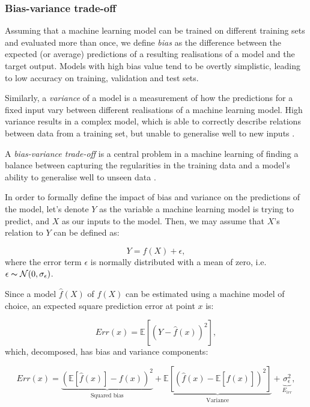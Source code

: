 \subsubsection{Bias-variance trade-off}

Assuming that a machine learning model can be trained on different training sets and evaluated more than once, we define \emph{bias} as the difference between the expected (or average) predictions of a resulting realisations of a model and the target output. Models with high bias value tend to be overtly simplistic, leading to low accuracy on training, validation and test sets.

Similarly, a \emph{variance} of a model is a measurement of how the predictions for a fixed input vary between different realisations of a machine learning model. High variance results in a complex model, which is able to correctly describe relations between data from a training set, but unable to generalise well to new inputs \cite{fortmann-roe:biasvariance}.

A \emph{bias-variance trade-off} is a central problem in a machine learning of finding a balance between capturing the regularities in the training data and a model's ability to generalise well to unseen data \cite{wiki:biasvariance}.

In order to formally define the impact of bias and variance on the predictions of the model, let's denote $Y$ as the variable a machine learning model is trying to predict, and $X$ as our inputs to the model. Then, we may assume that $X$'s relation to $Y$ can be defined as:

\begin{equation}
Y = f(X) + \epsilon,
\end{equation}
where the error term $\epsilon$ is normally distributed with a mean of zero, i.e. $\epsilon \thicksim \mathcal{N}(0, \sigma_\epsilon)$. 

Since a model $\hat{f}(X)$ of $f(X)$ can be estimated using a machine model of choice, an expected square prediction error at point $x$ is:

\begin{equation}
Err(x) = \mathbb{E}[(Y - \hat{f}(x))^2],
\end{equation}
which, decomposed, has bias and variance components:

\begin{equation}
Err(x) =     \underbrace{(\mathbb{E}[\hat{f}(x)] - f(x))^2}_\text{Squared bias} + \underbrace{\mathbb{E}[(\hat{f}(x) - \mathbb{E}[\hat{f}(x)])^2]}_\text{Variance} + \underbrace{\sigma^2_\epsilon}_\text{$E_{irr}$},
\label{biasvariance:1}
\end{equation}

